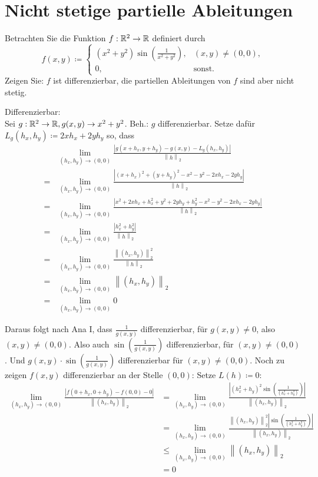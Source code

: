 \documentclass[sectionformat=aufgabe]{gadsescript}
\begin{document}
\section{Nicht stetige partielle Ableitungen}
Betrachten Sie die Funktion $ f : \mathbb{R} ^2 \to \mathbb{R}  $ definiert durch
\[
	f(x, y) \coloneqq \begin{cases}
		(x^2 + y^2) \sin \left( \frac{ 1 }{ x^2 + y^2 }  \right) , &(x, y) \neq (0, 0),\\
		0, &\text{sonst.} 
	\end{cases}
\]
Zeigen Sie: $ f $ ist differenzierbar, die partiellen Ableitungen von $ f $ sind aber nicht stetig.

Differenzierbar:\\
Sei $ g : \mathbb{R} ^2 \to \mathbb{R} , g(x, y) \to x^2 + y^2 $.
Beh.: $ g $ differenzierbar.
Setze dafür $ L_g(h_x, h_y) \coloneqq 2xh_x + 2yh_y $ so, dass
\begin{align*}
	~&\lim_{(h_x, h_y) \to (0, 0)} \frac{ \left| g(x + h_x, y + h_y) - g(x, y) - L_g(h_x, h_y) \right| }{ \left\| h \right\|_2  } \\
	=& \lim_{(h_x, h_y) \to (0, 0)} \frac{ \left| (x + h_x)^2 + (y + h_y)^2 - x^2 - y^2 - 2xh_x - 2yh_y \right| }{ \left\| h \right\|_2  }  \\
	=& \lim_{(h_x, h_y) \to (0, 0)} \frac{ \left| x^2 + 2xh_x + h_x^2 + y^2 + 2yh_y + h_y^2 - x^2 - y^2 - 2xh_x - 2yh_y \right| }{ \left\| h \right\|_2  }  \\
	=& \lim_{(h_x, h_y) \to (0, 0)} \frac{ \left| h_x^2 + h_y^2 \right| }{ \left\| h \right\|_2  }  \\
	=& \lim_{(h_x, h_y) \to (0, 0)} \frac{ \left\| (h_x, h_y) \right\| _2^2 }{ \left\| h \right\|_2  }  \\
	=& \lim_{(h_x, h_y) \to (0, 0)} \left\| (h_x, h_y) \right\| _2 \\
	=& \lim_{(h_x, h_y) \to (0, 0)} 0
\end{align*}

Daraus folgt nach Ana I, dass $ \frac{ 1 }{ g(x, y) }  $ differenzierbar, für $ g(x, y) \neq 0 $, also $ (x, y) \neq (0, 0) $.
Also auch $ \sin \left( \frac{ 1 }{ g(x, y) }  \right)  $ differenzierbar, für $ (x, y) \neq (0, 0) $.
Und $ g(x, y) \cdot \sin \left( \frac{ 1 }{ g(x, y) }  \right)  $ differenzierbar für $ (x, y) \neq (0, 0) $.
Noch zu zeigen $ f(x, y) $ differenzierbar an der Stelle $ (0, 0) $:
Setze $ L(h) \coloneqq 0 $:
\begin{align*}
	\lim_{(h_x, h_y) \to (0, 0)} \frac{ \left| f(0 + h_x, 0 + h_y) - f(0, 0) - 0 \right| }{ \left\| (h_x, h_y) \right\|_2  } &= \lim_{(h_x, h_y) \to (0, 0)} \frac{ \left| (h_x^2 + h_y)^2 \sin \left( \frac{ 1 }{ (h_x^2 + h_y^2) }  \right) \right| }{ \left\| (h_x, h_y) \right\|_2  }  \\
	&= \lim_{(h_x, h_y) \to (0, 0)} \frac{ \left\| (h_x, h_y) \right\|_2^2 \left| \sin \left( \frac{ 1 }{ (h_x^2 + h_y^2) }  \right) \right| }{ \left\| (h_x, h_y) \right\|_2  }  \\
	&\leq  \lim_{(h_x, h_y) \to (0, 0)} \left\| (h_x, h_y) \right\|_2 \\
	&= 0
\end{align*}
\end{document}
